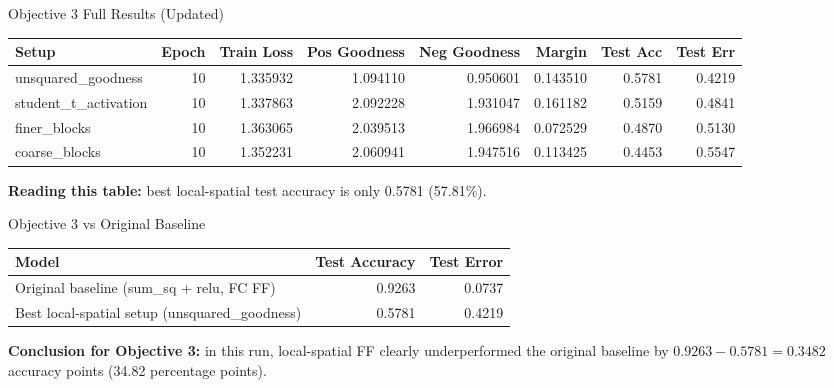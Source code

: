 \documentclass[aspectratio=169]{beamer}
\begin{document}
\begin{frame}{Objective 3 Full Results (Updated)}
\scriptsize
\begin{table}[h]
\centering
\begin{tabular}{l r r r r r r r}
\hline
Setup & Epoch & Train Loss & Pos Goodness & Neg Goodness & Margin & Test Acc & Test Err \\
\hline
unsquared\_goodness & 10 & 1.335932 & 1.094110 & 0.950601 & 0.143510 & 0.5781 & 0.4219 \\
student\_t\_activation & 10 & 1.337863 & 2.092228 & 1.931047 & 0.161182 & 0.5159 & 0.4841 \\
finer\_blocks & 10 & 1.363065 & 2.039513 & 1.966984 & 0.072529 & 0.4870 & 0.5130 \\
coarse\_blocks & 10 & 1.352231 & 2.060941 & 1.947516 & 0.113425 & 0.4453 & 0.5547 \\
\hline
\end{tabular}
\end{table}
\normalsize

\textbf{Reading this table:} best local-spatial test accuracy is only 0.5781 (57.81\%).
\end{frame}

\begin{frame}{Objective 3 vs Original Baseline}
\begin{table}[h]
\centering
\begin{tabular}{l r r}
\hline
Model & Test Accuracy & Test Error \\
\hline
Original baseline (sum\_sq + relu, FC FF) & 0.9263 & 0.0737 \\
Best local-spatial setup (unsquared\_goodness) & 0.5781 & 0.4219 \\
\hline
\end{tabular}
\end{table}

\vspace{0.2cm}
\textbf{Conclusion for Objective 3:} in this run, local-spatial FF clearly underperformed the original baseline by
\(0.9263 - 0.5781 = 0.3482\) accuracy points (34.82 percentage points).
\end{frame}
\end{document}
